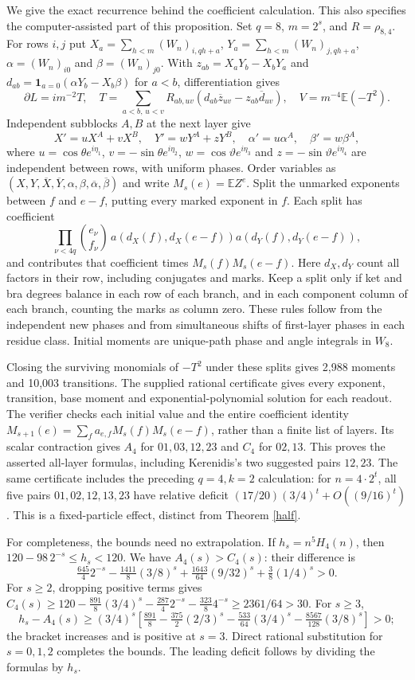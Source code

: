 \documentclass[11pt]{article}
\newcommand{\E}{\mathbb E}
\begin{document}
We give the exact recurrence behind the coefficient calculation. This also
specifies the computer-assisted part of this proposition. Set $q=8$, $m=2^s$,
and $R=\rho_{8,4}$. For rows $i,j$ put
$X_a=\sum_{h<m}(W_n)_{i,qh+a}$, $Y_a=\sum_{h<m}(W_n)_{j,qh+a}$,
$\alpha=(W_n)_{i0}$ and $\beta=(W_n)_{j0}$.
With $z_{ab}=X_aY_b-X_bY_a$ and $d_{ab}=\mathbf1_{a=0}(\alpha Y_b-X_b\beta)$
for $a<b$, differentiation gives
\[
 \partial L=im^{-2}T,\quad
 T=\sum_{a<b,\,u<v}R_{ab,uv}(d_{ab}\overline z_{uv}-z_{ab}\overline d_{uv}),
 \quad V=m^{-4}\E(-T^2).
\]
Independent subblocks $A,B$ at the next layer give
\[
 X'=uX^A+vX^B,\quad Y'=wY^A+zY^B,\quad
 \alpha'=u\alpha^A,\quad\beta'=w\beta^A,
\]
where $u=\cos\theta e^{i\eta_1}$, $v=-\sin\theta e^{i\eta_2}$,
$w=\cos\vartheta e^{i\eta_3}$ and $z=-\sin\vartheta e^{i\eta_4}$
are independent between rows, with uniform phases.
Order variables as $(X,Y,\overline X,\overline Y,\alpha,\beta,
\overline\alpha,\overline\beta)$ and write $M_s(e)=\E Z^e$.
Split the unmarked exponents between $f$ and $e-f$, putting every marked
exponent in $f$. Each split has coefficient
\[
 \prod_{\nu<4q}\binom{e_\nu}{f_\nu}\,
 a(d_X(f),d_X(e-f))a(d_Y(f),d_Y(e-f)),
\]
and contributes that coefficient times $M_s(f)M_s(e-f)$.
Here $d_X,d_Y$ count all factors in their row, including conjugates and marks.
Keep a split only if ket and bra degrees balance in each row of each branch,
and in each component column of each branch, counting the marks as column zero.
These rules follow from the independent new phases and from simultaneous shifts
of first-layer phases in each residue class. Initial moments are unique-path
phase and angle integrals in $W_8$.

Closing the surviving monomials of $-T^2$ under these splits gives 2,988 moments
and 10,003 transitions. The supplied rational certificate gives every exponent,
transition, base moment and exponential-polynomial solution for each readout.
The verifier checks each initial value and the entire coefficient identity
$M_{s+1}(e)=\sum_f a_{e,f}M_s(f)M_s(e-f)$, rather than a finite list of layers.
Its scalar contraction gives $A_4$ for $01,03,12,23$ and $C_4$ for $02,13$.
This proves the asserted all-layer formulas, including Kerenidis's two suggested
pairs $12,23$. The same certificate includes the preceding $q=4,k=2$ calculation:
for $n=4\cdot2^t$, all five pairs $01,02,12,13,23$ have relative deficit
$(17/20)(3/4)^t+O((9/16)^t)$. This is a fixed-particle effect, distinct from
Theorem \ref{half}.

For completeness, the bounds need no extrapolation. If $h_s=n^5H_4(n)$, then
$120-98\,2^{-s}\leq h_s<120$. We have $A_4(s)>C_4(s)$: their difference is
\[
 \tfrac{645}{4}2^{-s}-\tfrac{1411}{8}(3/8)^s
       +\tfrac{1643}{64}(9/32)^s+\tfrac38(1/4)^s>0.
\]
For $s\geq2$, dropping positive terms gives
$C_4(s)\geq120-\tfrac{891}{8}(3/4)^s-\tfrac{287}{4}2^{-s}
-\tfrac{323}{8}4^{-s}\geq2361/64>30$.
For $s\geq3$,
\[
 h_s-A_4(s)\geq(3/4)^s\left[
 \tfrac{891}{8}-\tfrac{375}{2}(2/3)^s
 -\tfrac{533}{64}(3/4)^s-\tfrac{8567}{128}(3/8)^s\right]>0;
\]
the bracket increases and is positive at $s=3$.
Direct rational substitution for $s=0,1,2$ completes the bounds.
The leading deficit follows by dividing the formulas by $h_s$.
\end{document}
